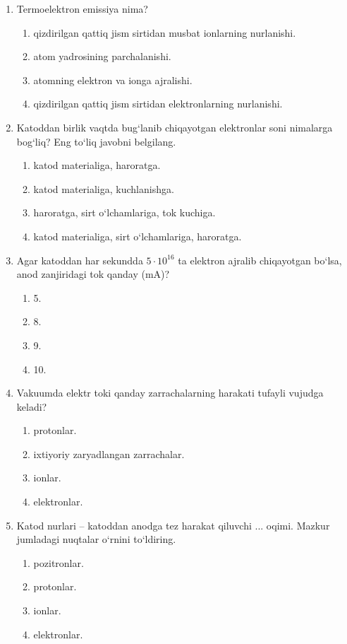 \begin{enumerate}

\item Termoelektron emissiya nima?
\begin{enumerate}[label=\Alph*)]
\item qizdirilgan qattiq jism sirtidan musbat ionlarning nurlanishi.
\item atom yadrosining parchalanishi.
\item atomning elektron va ionga ajralishi.
\item qizdirilgan qattiq jism sirtidan elektronlarning nurlanishi.
\end{enumerate}

\item Katoddan birlik vaqtda bug‘lanib chiqayotgan elektronlar soni nimalarga bog‘liq? Eng to‘liq javobni belgilang.
\begin{enumerate}[label=\Alph*)]
\item katod materialiga, haroratga.
\item katod materialiga, kuchlanishga.
\item haroratga, sirt o‘lchamlariga, tok kuchiga.
\item katod materialiga, sirt o‘lchamlariga, haroratga.
\end{enumerate}

\item Agar katoddan har sekundda $5 \cdot 10^{16}$ ta elektron ajralib chiqayotgan bo‘lsa, anod zanjiridagi tok qanday (mA)?
\begin{enumerate}[label=\Alph*)]
\item 5.
\item 8.
\item 9.
\item 10.
\end{enumerate}

\item Vakuumda elektr toki qanday zarrachalarning harakati tufayli vujudga keladi?
\begin{enumerate}[label=\Alph*)]
\item protonlar.
\item ixtiyoriy zaryadlangan zarrachalar.
\item ionlar.
\item elektronlar.
\end{enumerate}

\item Katod nurlari – katoddan anodga tez harakat qiluvchi ... oqimi. Mazkur jumladagi nuqtalar o‘rnini to‘ldiring.
\begin{enumerate}[label=\Alph*)]
\item pozitronlar.
\item protonlar.
\item ionlar.
\item elektronlar.
\end{enumerate}



\end{enumerate}
